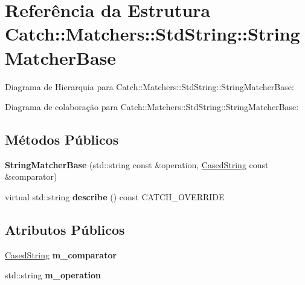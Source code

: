 \hypertarget{structCatch_1_1Matchers_1_1StdString_1_1StringMatcherBase}{}\section{Referência da Estrutura Catch\+:\+:Matchers\+:\+:Std\+String\+:\+:String\+Matcher\+Base}
\label{structCatch_1_1Matchers_1_1StdString_1_1StringMatcherBase}


Diagrama de Hierarquia para Catch\+:\+:Matchers\+:\+:Std\+String\+:\+:String\+Matcher\+Base\+:


Diagrama de colaboração para Catch\+:\+:Matchers\+:\+:Std\+String\+:\+:String\+Matcher\+Base\+:
\subsection*{Métodos Públicos}
\begin{DoxyCompactItemize}
\item 
{\bfseries String\+Matcher\+Base} (std\+::string const \&operation, \hyperlink{structCatch_1_1Matchers_1_1StdString_1_1CasedString}{Cased\+String} const \&comparator)\hypertarget{structCatch_1_1Matchers_1_1StdString_1_1StringMatcherBase_a3a9b66bae298ae27058478529b4bb39d}{}\label{structCatch_1_1Matchers_1_1StdString_1_1StringMatcherBase_a3a9b66bae298ae27058478529b4bb39d}

\item 
virtual std\+::string {\bfseries describe} () const C\+A\+T\+C\+H\+\_\+\+O\+V\+E\+R\+R\+I\+DE\hypertarget{structCatch_1_1Matchers_1_1StdString_1_1StringMatcherBase_a9d15cfb882efbea778b2ed29e7f48f37}{}\label{structCatch_1_1Matchers_1_1StdString_1_1StringMatcherBase_a9d15cfb882efbea778b2ed29e7f48f37}

\end{DoxyCompactItemize}
\subsection*{Atributos Públicos}
\begin{DoxyCompactItemize}
\item 
\hyperlink{structCatch_1_1Matchers_1_1StdString_1_1CasedString}{Cased\+String} {\bfseries m\+\_\+comparator}\hypertarget{structCatch_1_1Matchers_1_1StdString_1_1StringMatcherBase_a17c9f0fe40587070ffe998c193742831}{}\label{structCatch_1_1Matchers_1_1StdString_1_1StringMatcherBase_a17c9f0fe40587070ffe998c193742831}

\item 
std\+::string {\bfseries m\+\_\+operation}\hypertarget{structCatch_1_1Matchers_1_1StdString_1_1StringMatcherBase_a7a25c4b7d863e9a1c406d81efd0f83ca}{}\label{structCatch_1_1Matchers_1_1StdString_1_1StringMatcherBase_a7a25c4b7d863e9a1c406d81efd0f83ca}

\end{DoxyCompactItemize}


